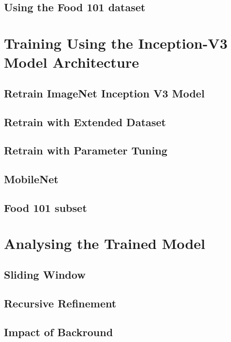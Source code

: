 \section{Using the Food 101 dataset}


\chapter{Training Using the Inception-V3 Model Architecture}
\section{Retrain ImageNet Inception V3 Model}


\section{Retrain with Extended Dataset}


\section{Retrain with Parameter Tuning}


\section{MobileNet}


\section{Food 101 subset}


\chapter{Analysing the Trained Model}
\section{Sliding Window}


\section{Recursive Refinement}


\section{Impact of Backround}


